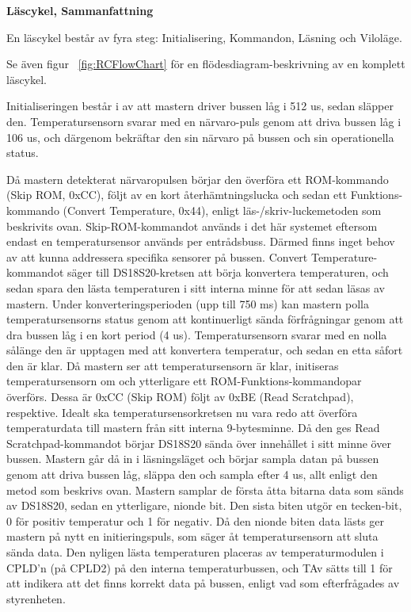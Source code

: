 \documentclass[a4paper,11pt]{article}
\begin{document}
{\noindent \bf Läscykel, Sammanfattning}

En läscykel består av fyra steg: Initialisering, Kommandon, Läsning och Viloläge.

Se även figur ~\ref{fig:RCFlowChart} för en flödesdiagram-beskrivning av en komplett läscykel.

Initialiseringen består i av att mastern driver bussen låg i 512 us, sedan släpper den.
Temperatursensorn svarar med en närvaro-puls genom att driva bussen låg i 106 us, och därgenom bekräftar den sin närvaro
på bussen och sin operationella status.

Då mastern detekterat närvaropulsen börjar den överföra ett ROM-kommando (Skip ROM, 0xCC), följt av en kort återhämtningslucka
och sedan ett Funktions-kommando (Convert Temperature, 0x44), enligt läs-/skriv-luckemetoden som beskrivits ovan.
Skip-ROM-kommandot används i det här systemet eftersom endast en temperatursensor används per entrådsbuss.
Därmed finns inget behov av att kunna addressera specifika sensorer på bussen.
Convert Temperature-kommandot säger till DS18S20-kretsen att börja konvertera temperaturen, och sedan spara den 
lästa temperaturen i sitt interna minne för att sedan läsas av mastern.
Under konverteringsperioden (upp till 750 ms) kan mastern polla temperatursensorns status genom att kontinuerligt
sända förfrågningar genom att dra bussen låg i en kort period (4 us). Temperatursensorn svarar med en nolla
sålänge den är upptagen med att konvertera temperatur, och sedan en etta såfort den är klar.
Då mastern ser att temperatursensorn är klar, initiseras temperatursensorn om och ytterligare ett ROM-Funktions-kommandopar
överförs. Dessa är 0xCC (Skip ROM) följt av 0xBE (Read Scratchpad), respektive.
Idealt ska temperatursensorkretsen nu vara redo att överföra temperaturdata till mastern från sitt interna 9-bytesminne.
Då den ges Read Scratchpad-kommandot börjar DS18S20 sända över innehållet i sitt minne över bussen.
Mastern går då in i läsningsläget och börjar sampla datan på bussen genom att driva bussen låg, släppa den och sampla efter 4 us,
allt enligt den metod som beskrivs ovan. Mastern samplar de första åtta bitarna data som sänds av DS18S20, sedan en ytterligare,
nionde bit. Den sista biten utgör en tecken-bit, 0 för positiv temperatur och 1 för negativ. Då den nionde biten data lästs
ger mastern på nytt en initieringspuls, som säger åt temperatursensorn att sluta sända data.
Den nyligen lästa temperaturen placeras av temperaturmodulen i CPLD'n (på CPLD2) på den interna temperaturbussen, och
TAv sätts till 1 för att indikera att det finns korrekt data på bussen, enligt vad som efterfrågades av styrenheten.\\
\end{document}
